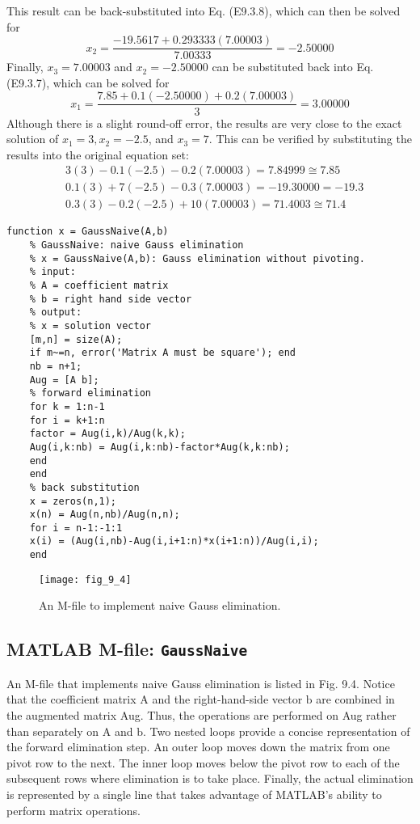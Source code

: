 \documentclass[../main.tex]{subfiles}
\begin{document}
\begin{example}
$$    $$
    This result can be back-substituted into Eq. (E9.3.8), which can then be solved for
    $$
    x_{2}=\frac{-19.5617+0.293333(7.00003)}{7.00333}=-2.50000
    $$
    Finally, $x_{3}=7.00003$ and $x_{2}=-2.50000$ can be substituted back into Eq. (E9.3.7), which can be solved for
    $$
    x_{1}=\frac{7.85+0.1(-2.50000)+0.2(7.00003)}{3}=3.00000
    $$
    Although there is a slight round-off error, the results are very close to the exact solution of $x_{1}=3, x_{2}=-2.5$, and $x_{3}=7$. This can be verified by substituting the results into the original equation set:
    $$
    \begin{aligned}
    &3(3)-0.1(-2.5)-0.2(7.00003)=7.84999 \cong 7.85 \\
    &0.1(3)+7(-2.5)-0.3(7.00003)=-19.30000=-19.3 \\
    &0.3(3)-0.2(-2.5)+10(7.00003)=71.4003 \cong 71.4
    \end{aligned}
    $$

\end{example}

\begin{lstlisting}[numbers=none,frame=none]
    function x = GaussNaive(A,b)
    % GaussNaive: naive Gauss elimination
    % x = GaussNaive(A,b): Gauss elimination without pivoting.
    % input:
    % A = coefficient matrix
    % b = right hand side vector
    % output:
    % x = solution vector
    [m,n] = size(A);
    if m~=n, error('Matrix A must be square'); end
    nb = n+1;
    Aug = [A b];
    % forward elimination
    for k = 1:n-1
    for i = k+1:n
    factor = Aug(i,k)/Aug(k,k);
    Aug(i,k:nb) = Aug(i,k:nb)-factor*Aug(k,k:nb);
    end
    end
    % back substitution
    x = zeros(n,1);
    x(n) = Aug(n,nb)/Aug(n,n);
    for i = n-1:-1:1
    x(i) = (Aug(i,nb)-Aug(i,i+1:n)*x(i+1:n))/Aug(i,i);
    end
\end{lstlisting}
\begin{figure}[H]
    \centering
    \texttt{[image: fig\_9\_4]}
    \caption{\textsf{An M-file to implement naive Gauss elimination.}}
    \label{fig:fig_9_4}
\end{figure}

\subsection{MATLAB M-file: \texttt{GaussNaive}}
An M-file that implements naive Gauss elimination is listed in Fig. 9.4. Notice that the coefficient matrix A and the right-hand-side vector $\mathrm{b}$ are combined in the augmented matrix Aug. Thus, the operations are performed on Aug rather than separately on A and $\mathrm{b}$.
Two nested loops provide a concise representation of the forward elimination step. An outer loop moves down the matrix from one pivot row to the next. The inner loop moves below the pivot row to each of the subsequent rows where elimination is to take place. Finally, the actual elimination is represented by a single line that takes advantage of MATLAB's ability to perform matrix operations.
\end{document}

